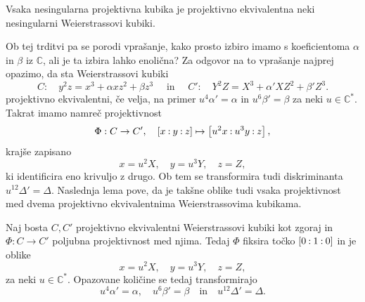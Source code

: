 \documentclass[mat1]{fmfdelo}
\numberwithin{equation}{section}
\newcommand{\C}{\mathbb C}
\newcommand{\CM}{\mathbb C ^*}
\newcommand{\pcoor}[1]{%
\begingroup\lccode`~=`: \lowercase{\endgroup
\edef~}{\mathbin{\mathchar\the\mathcode`:}\nobreak}%
\left[%
\begingroup
\mathcode`:=\string"8000
#1%
\endgroup
\right]%
}
\theoremstyle{definition}
\begin{document}

\begin{trditev}
    \label{kubika izomorfna neki wnf}
    Vsaka nesingularna projektivna kubika je projektivno ekvivalentna neki nesingularni Weierstrassovi kubiki.  
\end{trditev}

Ob tej trditvi pa se porodi vprašanje, kako prosto izbiro imamo s koeficientoma $\alpha$ in $\beta$ iz $\C$, ali je ta izbira lahko enolična? Za odgovor na to vprašanje najprej opazimo, da sta Weierstrassovi kubiki 
\[
    C: \quad y^2z = x^3 + \alpha xz^2 + \beta z^3 \quad \text{ in } \quad
    C': \quad Y^2Z = X^3 + \alpha' XZ^2 + \beta' Z^3. 
\]
projektivno ekvivalentni, če velja, na primer $u^4 \alpha' = \alpha$ in $u^6 \beta' = \beta$ za neki $u \in \CM$. Takrat imamo namreč projektivnost
\begin{align*}
    \Phi:C \to C', \quad
    \pcoor{x : y : z} \mapsto \pcoor{u^2x : u^3y : z},
\end{align*}
krajše zapisano 
\[
    x = u^2 X, \quad y = u^3 Y, \quad z = Z,  
\]
ki identificira eno krivuljo z drugo. Ob tem se transformira tudi diskriminanta $u^{12} \Delta' = \Delta$. Naslednja lema pove, da je takšne oblike tudi vsaka projektivnost med dvema projektivno ekvivalentnima Weierstrassovima kubikama. 
        
\begin{lema}
    \label{projektivnosti wnf}
    Naj bosta $C, C'$ projektivno ekvivalentni Weierstrassovi kubiki kot zgoraj in $\Phi: C \to C'$ poljubna projektivnost med njima. Tedaj $\Phi$ fiksira točko $\pcoor{0 : 1 : 0}$ in je oblike
    \begin{equation}
        \label{eq:transformacija wnf}
        x = u^2 X, \quad y = u^3 Y, \quad z = Z,  
    \end{equation}
    za neki $u \in \CM$. Opazovane količine se tedaj transformirajo 
    \begin{equation}
        \label{eq:transformacija koeficientov in diskriminante}
        u^4 \alpha' = \alpha, \quad u^6 \beta' = \beta \quad \text{in} \quad u^{12} \Delta' = \Delta.
    \end{equation}
\end{lema}
\end{document}
